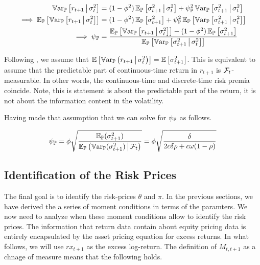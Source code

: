 \documentclass[11pt, letterpaper, twoside, final]{article}
\begin{document}
\begin{align}
    \Var_{\PP}\left[r_{t+1} \mvert \sigma^2_t\right]  &= (1 - \phi^2) \E_{\PP}\left[\sigma^2_{t+1} \mvert
    \sigma^2_t \right] + \psi_{\PP}^2 \Var_{\PP}\left[\sigma^2_{t+1} \mvert \sigma^2_t \right]  \\
%
    \implies \E_{\PP}\left[\Var_{\PP}\left[r_{t+1} \mvert \sigma^2_t\right]\right]  &= (1 - \phi^2)
    \E_{\PP}\left[\sigma^2_{t+1} \right] + \psi_{\PP}^2 \E_{\PP}\left[\Var_{\PP}\left[\sigma^2_{t+1} \mvert
    \sigma^2_t \right]\right]  \\
%
    \implies \psi_{\PP} &= \frac{\E_{\PP}\left[\Var_{\PP}\left[r_{t+1} \mvert \sigma^2_t\right]\right] -  (1 -
    \phi^2) \E_{\PP}\left[\sigma^2_{t+1} \right]}{\E_{\PP}\left[\Var_{\PP}\left[\sigma^2_{t+1} \mvert \sigma^2_t
    \right]\right] }
\end{align}

Following \textcite{khrapov2016affine}, we assume that $\operatorname{\mathbb{E}}\left[\operatorname{\mathbb{V}ar}_{\mathbb{P}}\left(r_{t+1} \,\middle\vert\,
\sigma^2_t\right)\right] = \operatorname{\mathbb{E}}\left[\sigma^2_{t+1}\right]$. 
This is equivalent to assume that the predictable part of continuous-time return in $r_{t+1}$  is
$\mathcal{F}_{t}$-measurable.
In other words, the continuous-time and discrete-time risk premia coincide.
Note, this is statement is about the predictable part of the return, it is not about the information content in
the volatility. 

Having made that assumption that we can solve for $\psi_{\mathbb{P}}$ as follows.

\begin{equation}
    \psi_{\mathbb{P}}  = \phi \sqrt{\frac{\operatorname{\mathbb{E}}_{\mathbb{P}}(\sigma^2_{t+1})}{\operatorname{\mathbb{E}}_{\mathbb{P}}\left(\operatorname{\mathbb{V}ar}_{\mathbb{P}}(\sigma^2_{t+1}) \,\middle\vert\, \mathcal{F}_t
    \right) }}
    = \phi \sqrt{\frac{\delta}{2 c \delta \rho + c \omega (1 - \rho)}}
    \label{eqn:psi_function}
\end{equation}


\subsection{Identification of the Risk Prices}

The final goal is to identify the risk-prices $\theta$ and $\pi$.
In the previous sections, we have derived the a series of moment conditions in terms of the paramters.
We now need to analyze when these moment conditions allow to identify the risk prices. 
The information that return data contain about equity pricing data is entirely encapsulated by the asset pricing
equation for excess returns.  
In what follows, we will use $rx_{t+1}$ as the excess log-return.
The definition of $M_{t,t+1}$ as a chnage of measure means that the following holds.
\end{document}
